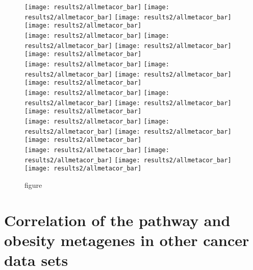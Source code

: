 \begin{appendices}
	\begin{figure}[htpb]
		\ContinuedFloat
		\captionsetup{list=off,format=cont}
		\centering
		\texttt{[image: results2/allmetacor\_bar]}
		\texttt{[image: results2/allmetacor\_bar]}
		\texttt{[image: results2/allmetacor\_bar]}
		\texttt{[image: results2/allmetacor\_bar]}\\
		\texttt{[image: results2/allmetacor\_bar]}
		\texttt{[image: results2/allmetacor\_bar]}
		\texttt{[image: results2/allmetacor\_bar]}
		\texttt{[image: results2/allmetacor\_bar]}\\
		\texttt{[image: results2/allmetacor\_bar]}
		\texttt{[image: results2/allmetacor\_bar]}
		\texttt{[image: results2/allmetacor\_bar]}
		\texttt{[image: results2/allmetacor\_bar]}\\
		\texttt{[image: results2/allmetacor\_bar]}
		\texttt{[image: results2/allmetacor\_bar]}
		\texttt{[image: results2/allmetacor\_bar]}
		\texttt{[image: results2/allmetacor\_bar]}\\
		\texttt{[image: results2/allmetacor\_bar]}
		\texttt{[image: results2/allmetacor\_bar]}
		\texttt{[image: results2/allmetacor\_bar]}
		\texttt{[image: results2/allmetacor\_bar]}\\
		\texttt{[image: results2/allmetacor\_bar]}
		\texttt{[image: results2/allmetacor\_bar]}
		\texttt{[image: results2/allmetacor\_bar]}
		\texttt{[image: results2/allmetacor\_bar]}\\
		\caption{figure}
	\end{figure}
	\newpage

	\section{Correlation of the pathway and obesity metagenes in other cancer data sets}
	\label{sec:correlation_of_the_pathway_and_obesity_metagenes_in_other_cancer_data_sets}


\end{appendices}
